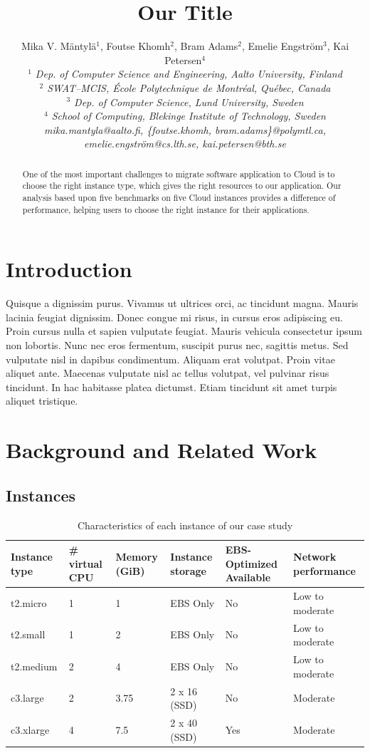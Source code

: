 \documentclass[10pt, conference]{IEEEtran}
\title{Our Title}
\author{Mika V. M\"antyl\"a$^{1}$, Foutse Khomh$^{2}$, Bram Adams$^{2}$, Emelie Engstr\"om$^{3}$, Kai Petersen$^{4}$
    \\
    \emph{$^{1}$ Dep. of Computer Science and Engineering, Aalto University, Finland}
    \\
    \emph{$^{2}$ SWAT--MCIS, \'{E}cole Polytechnique de Montr\'{e}al, Qu\'{e}bec, Canada}
    \\
    \emph{$^{3}$ Dep. of Computer Science, Lund University, Sweden}
    \\
    \emph{$^{4}$ School of Computing, Blekinge Institute of Technology, Sweden}
    \\
    \emph{mika.mantyla@aalto.fi, \{foutse.khomh, bram.adams\}@polymtl.ca, emelie.engstr\"om@cs.lth.se, kai.petersen@bth.se }}
\begin{document}
\maketitle

\begin{abstract}
One of the most important challenges to migrate software application to Cloud is to choose the right instance type, which gives the right resources to our application. Our analysis based upon five benchmarks on five Cloud instances provides a difference of performance, helping users to choose the right instance for their applications. 
\end{abstract}

\section{Introduction}
\label{sec:introduction}

Quisque a dignissim purus. Vivamus ut ultrices orci, ac tincidunt magna. Mauris lacinia feugiat dignissim. Donec congue mi risus, in cursus eros adipiscing eu. Proin cursus nulla et sapien vulputate feugiat. Mauris vehicula consectetur ipsum non lobortis. Nunc nec eros fermentum, suscipit purus nec, sagittis metus. Sed vulputate nisl in dapibus condimentum. Aliquam erat volutpat. Proin vitae aliquet ante. Maecenas vulputate nisl ac tellus volutpat, vel pulvinar risus tincidunt. In hac habitasse platea dictumst. Etiam tincidunt sit amet turpis aliquet tristique.

\section{Background and Related Work}
\label{sec:backgr-relat-work}

\subsection{Instances}

\begin{table}
\begin{center}
\begin{tabular}{|l|l|l|l|l|l|}
  \hline
  Instance type & \# virtual CPU & Memory (GiB) & Instance storage & EBS-Optimized Available & Network performance \\
  \hline
  t2.micro & 1 & 1 & EBS Only & No & Low to moderate \\
  t2.small & 1 & 2 & EBS Only & No & Low to moderate \\
  t2.medium & 2 & 4 & EBS Only & No & Low to moderate \\
  c3.large & 2 & 3.75 & 2 x 16 (SSD) & No & Moderate \\
  c3.xlarge & 4 & 7.5 & 2 x 40 (SSD) & Yes & Moderate \\
   \hline
\end{tabular}
\caption{\label{table:instances} Characteristics of each instance of our case study}
\end{center}
\end{table}
\end{document}
